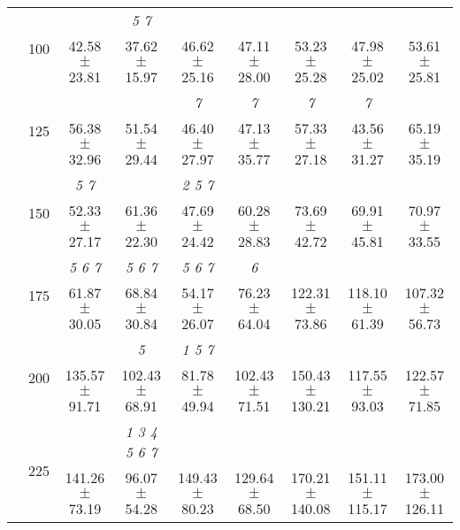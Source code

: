 \begin{table}[h]
{\begin{tabular}{
        ccccccccc}
 & \multirow{2}{*}{100}& & \textit{ 5 7 }& & & & &  \\ 
 & & 42.58 $\pm$ 23.81& 37.62 $\pm$ 15.97& 46.62 $\pm$ 25.16& 47.11 $\pm$ 28.00& 53.23 $\pm$ 25.28& 47.98 $\pm$ 25.02& 53.61 $\pm$ 25.81 \\ 
 & \multirow{2}{*}{125}& \cellcolor[HTML]{EFEFEF} & \cellcolor[HTML]{EFEFEF} & \cellcolor[HTML]{EFEFEF} \textit{ 7 }& \cellcolor[HTML]{EFEFEF} \textit{ 7 }& \cellcolor[HTML]{EFEFEF} \textit{ 7 }& \cellcolor[HTML]{EFEFEF} \textit{ 7 }& \cellcolor[HTML]{EFEFEF}  \\ 
 & & \cellcolor[HTML]{EFEFEF} 56.38 $\pm$ 32.96& \cellcolor[HTML]{EFEFEF} 51.54 $\pm$ 29.44& \cellcolor[HTML]{EFEFEF} 46.40 $\pm$ 27.97& \cellcolor[HTML]{EFEFEF} 47.13 $\pm$ 35.77& \cellcolor[HTML]{EFEFEF} 57.33 $\pm$ 27.18& \cellcolor[HTML]{EFEFEF} 43.56 $\pm$ 31.27& \cellcolor[HTML]{EFEFEF} 65.19 $\pm$ 35.19 \\ 
 & \multirow{2}{*}{150}& \textit{ 5 7 }& & \textit{ 2 5 7 }& & & &  \\ 
 & & 52.33 $\pm$ 27.17& 61.36 $\pm$ 22.30& 47.69 $\pm$ 24.42& 60.28 $\pm$ 28.83& 73.69 $\pm$ 42.72& 69.91 $\pm$ 45.81& 70.97 $\pm$ 33.55 \\ 
 & \multirow{2}{*}{175}& \cellcolor[HTML]{EFEFEF} \textit{ 5 6 7 }& \cellcolor[HTML]{EFEFEF} \textit{ 5 6 7 }& \cellcolor[HTML]{EFEFEF} \textit{ 5 6 7 }& \cellcolor[HTML]{EFEFEF} \textit{ 6 }& \cellcolor[HTML]{EFEFEF} & \cellcolor[HTML]{EFEFEF} & \cellcolor[HTML]{EFEFEF}  \\ 
 & & \cellcolor[HTML]{EFEFEF} 61.87 $\pm$ 30.05& \cellcolor[HTML]{EFEFEF} 68.84 $\pm$ 30.84& \cellcolor[HTML]{EFEFEF} 54.17 $\pm$ 26.07& \cellcolor[HTML]{EFEFEF} 76.23 $\pm$ 64.04& \cellcolor[HTML]{EFEFEF} 122.31 $\pm$ 73.86& \cellcolor[HTML]{EFEFEF} 118.10 $\pm$ 61.39& \cellcolor[HTML]{EFEFEF} 107.32 $\pm$ 56.73 \\ 
 & \multirow{2}{*}{200}& & \textit{ 5 }& \textit{ 1 5 7 }& & & &  \\ 
 & & 135.57 $\pm$ 91.71& 102.43 $\pm$ 68.91& 81.78 $\pm$ 49.94& 102.43 $\pm$ 71.51& 150.43 $\pm$ 130.21& 117.55 $\pm$ 93.03& 122.57 $\pm$ 71.85 \\ 
 & \multirow{2}{*}{225}& \cellcolor[HTML]{EFEFEF} & \cellcolor[HTML]{EFEFEF} \textit{ 1 3 4 5 6 7 }& \cellcolor[HTML]{EFEFEF} & \cellcolor[HTML]{EFEFEF} & \cellcolor[HTML]{EFEFEF} & \cellcolor[HTML]{EFEFEF} & \cellcolor[HTML]{EFEFEF}  \\ 
 & & \cellcolor[HTML]{EFEFEF} 141.26 $\pm$ 73.19& \cellcolor[HTML]{EFEFEF} 96.07 $\pm$ 54.28& \cellcolor[HTML]{EFEFEF} 149.43 $\pm$ 80.23& \cellcolor[HTML]{EFEFEF} 129.64 $\pm$ 68.50& \cellcolor[HTML]{EFEFEF} 170.21 $\pm$ 140.08& \cellcolor[HTML]{EFEFEF} 151.11 $\pm$ 115.17& \cellcolor[HTML]{EFEFEF} 173.00 $\pm$ 126.11 \\ 

\end{tabular}}
\end{table}
